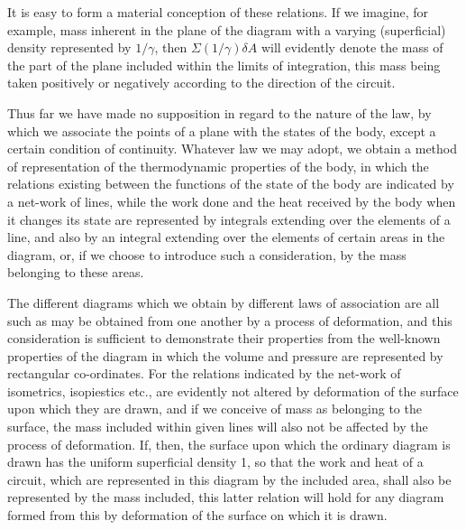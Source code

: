 \documentclass[11pt]{article}
\begin{document}
It is easy to form a material conception of these relations. If we imagine, for example, mass inherent in the plane of the diagram with a varying (superficial) density represented by $1/\gamma$, then $\Sigma (1/\gamma)\delta A$ will evidently denote the mass of the part of the plane included within the limits of integration, this mass being taken positively or negatively according to the direction of the circuit.

Thus far we have made no supposition in regard to the nature of the law, by which we associate the points of a plane with the states of the body, except a certain condition of continuity. Whatever law we may adopt, we obtain a method of representation of the thermodynamic properties of the body, in which the relations existing between the functions of the state of the body are indicated by a net-work of lines, while the work done and the heat received by the body when it changes its state are represented by integrals extending over the elements of a line, and also by an integral extending over the elements of certain areas in the diagram, or, if we choose to introduce such a consideration, by the mass belonging to these areas.

The different diagrams which we obtain by different laws of association are all such as may be obtained from one another by a process of deformation, and this consideration is sufficient to demonstrate their properties from the well-known properties of the diagram in which the volume and pressure are represented by rectangular co-ordinates. For the relations indicated by the net-work of isometrics, isopiestics etc., are evidently not altered by deformation of the surface upon which they are drawn, and if we conceive of mass as belonging to the surface, the mass included within given lines will also not be affected by the process of deformation. If, then, the surface upon which the ordinary diagram is drawn has the uniform superficial density 1, so that the work and heat of a circuit, which are represented in this diagram by the included area, shall also be represented by the mass included, this latter relation will hold for any diagram formed from this by deformation of the surface on which it is drawn.
\end{document}
